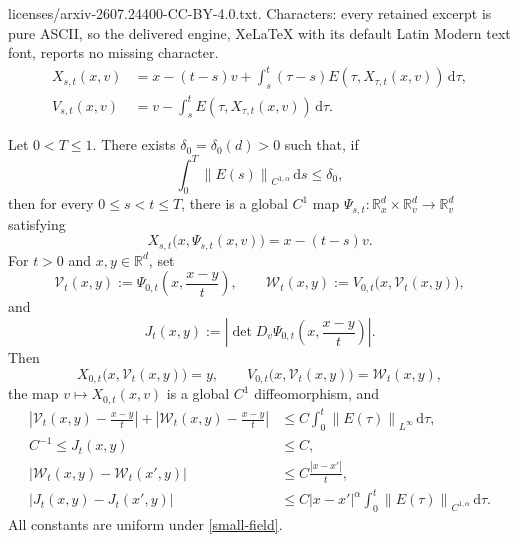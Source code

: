 \documentclass[10pt,a4paper]{amsart}
\newcommand{\R}{\mathbb R}
\newcommand{\dd}{\,\mathrm d}
\newcommand{\norm}[1]{\left\lVert #1\right\rVert}
\begin{document}
licenses/arxiv-2607.24400-CC-BY-4.0.txt. Characters: every retained excerpt is pure ASCII, so the delivered engine, XeLaTeX with its default Latin Modern text font, reports no missing character.
\begin{align}
 X_{s,t}(x,v)
 &=x-(t-s)v+\int_s^t(\tau-s)
     E(\tau,X_{\tau,t}(x,v))\dd\tau,\label{backward-X}\\
 V_{s,t}(x,v)
 &=v-\int_s^tE(\tau,X_{\tau,t}(x,v))\dd\tau.\label{backward-V}
\end{align}

\begin{lemma}\label{lem:twist}
Let $0<T\leq1$.  There exists $\delta_0=\delta_0(d)>0$ such that, if
\begin{equation}\label{small-field}
 \int_0^T\norm{E(s)}_{C^{1,\alpha}}\dd s\leq\delta_0,
\end{equation}
then for every $0\leq s<t\leq T$, there is a global $C^1$ map
$\Psi_{s,t}:\R^d_x\times\R^d_v\to\R^d_v$ satisfying
\begin{equation}\label{Psi-definition}
 X_{s,t}\bigl(x,\Psi_{s,t}(x,v)\bigr)=x-(t-s)v.
\end{equation}
For $t>0$ and $x,y\in\R^d$, set
\begin{equation}\label{VWJ-definition}
 \mathcal V_t(x,y)
 :=\Psi_{0,t}\left(x,\frac{x-y}{t}\right),\qquad
 \mathcal W_t(x,y)
 :=V_{0,t}\bigl(x,\mathcal V_t(x,y)\bigr),
\end{equation}
and
\begin{equation}\label{J-definition}
 J_t(x,y)
 :=\left|\det D_v\Psi_{0,t}
       \left(x,\frac{x-y}{t}\right)\right|.
\end{equation}
Then
\begin{equation}\label{endpoint-identities}
 X_{0,t}\bigl(x,\mathcal V_t(x,y)\bigr)=y,\qquad
 V_{0,t}\bigl(x,\mathcal V_t(x,y)\bigr)=\mathcal W_t(x,y),
\end{equation}
the map $v\mapsto X_{0,t}(x,v)$ is a global $C^1$ diffeomorphism, and
 \begin{align}
 \left|\mathcal V_t(x,y)-\frac{x-y}{t}\right|
 +\left|\mathcal W_t(x,y)-\frac{x-y}{t}\right|
 &\leq C\int_0^t\norm{E(\tau)}_{L^\infty}\dd\tau,\label{VWfree}\\
 C^{-1}\leq J_t(x,y)&\leq C,\label{twistbounds}\\
 \left|\mathcal W_t(x,y)-\mathcal W_t(x',y)\right|
 &\leq C\frac{|x-x'|}{t},\label{W-Lipschitz}\\
 |J_t(x,y)-J_t(x',y)|
 &\leq C|x-x'|^\alpha
       \int_0^t\norm{E(\tau)}_{C^{1,\alpha}}\dd\tau.\label{Jholder}
\end{align} 
All constants are uniform under \eqref{small-field}.
\end{lemma}
\end{document}
